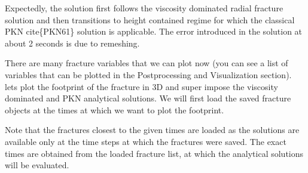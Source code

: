 \documentclass[letterpaper,10pt,english]{sphinxmanual}
\begin{document}

\sphinxAtStartPar
Expectedly, the solution first follows the viscosity dominated radial fracture solution and then transitions to height contained regime for which the classical PKN cite\{PKN61\} solution is applicable. The error introduced in the solution at about 2 seconds is due to re\sphinxhyphen{}meshing.

\sphinxAtStartPar
There are many fracture variables that we can plot now (you can see a list of variables that can be plotted in the Postprocessing and Visualization section). lets plot the footprint of the fracture in 3D and super impose the viscosity dominated and PKN analytical solutions. We will first load the saved fracture objects at the times at which we want to plot the footprint.

\begin{sphinxVerbatim}[commandchars=\\\{\}]
   
                                     \PYG{p}{[}      \PYG{p}{]}
  
\end{sphinxVerbatim}

\sphinxAtStartPar
Note that the fractures closest to the given times are loaded as the solutions are available only at the time steps at which the fractures were saved. The exact times are obtained from the loaded fracture list, at which the analytical solutions will be evaluated.
\end{document}
